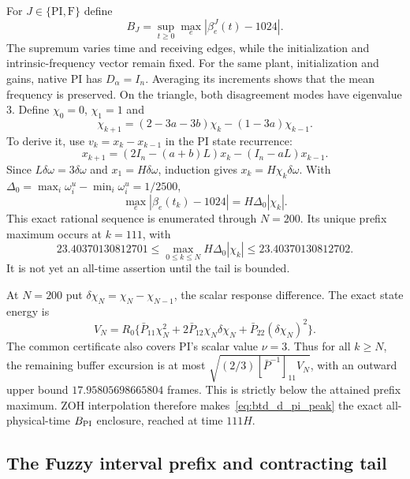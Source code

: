 For $J\in\{\mathrm{PI},\mathrm F\}$ define
\begin{equation}
 B_J=\sup_{t\ge0}\max_e|\beta_e^J(t)-1024|.
 \label{eq:btd_excursion}
\end{equation}
The supremum varies time and receiving edges, while the initialization
and intrinsic-frequency vector remain fixed. For the same plant, initialization and gains, native PI has
$D_\alpha=I_n$. Averaging its increments shows that the mean frequency is
preserved. On the triangle, both disagreement modes have eigenvalue 3.
Define $\chi_0=0$, $\chi_1=1$ and
\begin{equation}
 \chi_{k+1}=(2-3a-3b)\chi_k-(1-3a)\chi_{k-1}.
 \label{eq:btd_pi_scalar}
\end{equation}
To derive it, use $v_k=x_k-x_{k-1}$ in the PI state recurrence:
\[
 x_{k+1}=(2I_n-(a+b)L)x_k-(I_n-aL)x_{k-1}.
\]
Since $L\delta\omega=3\delta\omega$ and $x_1=H\delta\omega$,
induction gives $x_k=H\chi_k\delta\omega$. With
$\Delta_0=\max_i\omega_i^u-\min_i\omega_i^u=1/2500$,
\begin{equation}
 \max_e|\beta_e(t_k)-1024|=H\Delta_0|\chi_k|.
 \label{eq:btd_d_pi_deviation}
\end{equation}
This exact rational sequence is enumerated through $N=200$. Its unique
prefix maximum occurs at $k=111$, with
\begin{equation}
 23.40370130812701\le
 \max_{0\le k\le N}H\Delta_0|\chi_k|\le23.40370130812702.
 \label{eq:btd_d_pi_peak}
\end{equation}
It is not yet an all-time assertion until the tail is bounded.

At $N=200$ put $\delta\chi_N=\chi_N-\chi_{N-1}$, the scalar response difference. The exact state energy is
\begin{equation}
 V_N=R_0\{\bar P_{11}\chi_N^2+2\bar P_{12}\chi_N\delta\chi_N+\bar P_{22}(\delta\chi_N)^2\}.
 \label{eq:btd_d_pi_VN}
\end{equation}
The common certificate also covers PI's scalar value $\nu=3$. Thus for
all $k\ge N$, the remaining buffer excursion is at most
$\sqrt{(2/3)[\bar P^{-1}]_{11}V_N}$, with an outward upper bound
$17.95805698665804$ frames. This is strictly below the attained prefix
maximum. ZOH interpolation therefore makes~\eqref{eq:btd_d_pi_peak}
the exact all-physical-time $B_{\rm PI}$ enclosure, reached at time $111H$.

\subsection{The Fuzzy interval prefix and contracting tail}

